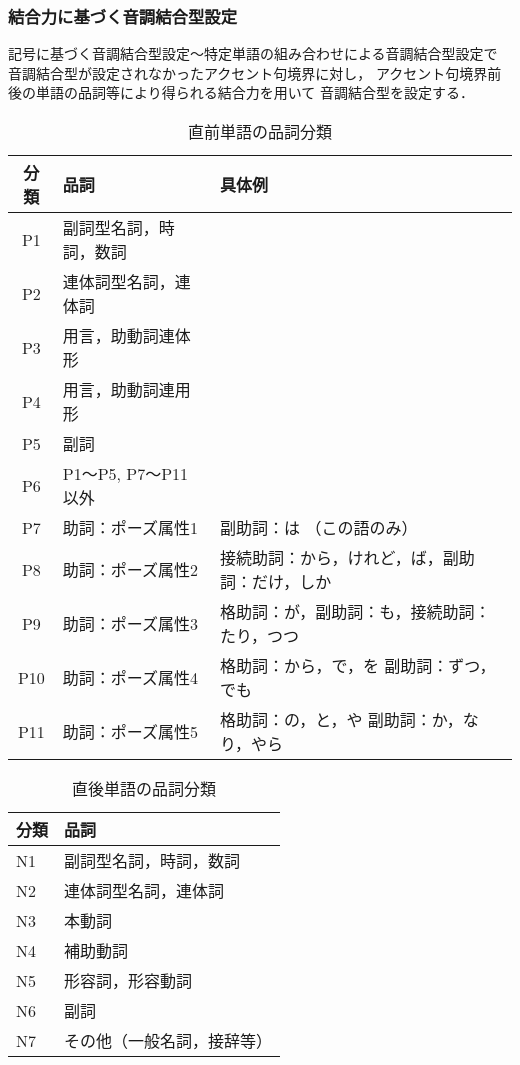 \subsubsection{結合力に基づく音調結合型設定}\label{subsub:ketsugo}
記号に基づく音調結合型設定〜特定単語の組み合わせによる音調結合型設定で
音調結合型が設定されなかったアクセント句境界に対し，
アクセント句境界前後の単語の品詞等により得られる結合力を用いて
音調結合型を設定する．

\begin{table}[t]
\caption{直前単語の品詞分類}
\label{tab:prev}
\begin{center}
\begin{tabular}{|c|l|l|} \hline
分類   & 品詞               & 具体例 \\\hline
P1 & 副詞型名詞，時詞，数詞 & \\ 
P2 & 連体詞型名詞，連体詞   & \\
P3 & 用言，助動詞連体形     & \\
P4 & 用言，助動詞連用形     & \\
P5 & 副詞                   & \\
P6 & P1〜P5, P7〜P11以外    & \\ 
P7 & 助詞：ポーズ属性1 & 副助詞：は （この語のみ）\\
P8 & 助詞：ポーズ属性2 & 接続助詞：から，けれど，ば，副助詞：だけ，しか\\
P9 & 助詞：ポーズ属性3 & 格助詞：が，副助詞：も，接続助詞：たり，つつ\\
P10 & 助詞：ポーズ属性4 & 格助詞：から，で，を 副助詞：ずつ，でも\\
P11 & 助詞：ポーズ属性5 & 格助詞：の，と，や 副助詞：か，なり，やら \\ \hline
\end{tabular}
\end{center}
\end{table}
\begin{table}[t]
\caption{直後単語の品詞分類}
\label{tab:next}
\begin{center}
\begin{tabular}{|l|l|} \hline
分類 & 品詞 \\\hline
N1 & 副詞型名詞，時詞，数詞 \\
N2 & 連体詞型名詞，連体詞 \\
N3 & 本動詞 \\
N4 & 補助動詞 \\
N5 & 形容詞，形容動詞 \\
N6 & 副詞 \\ 
N7 & その他（一般名詞，接辞等） \\\hline
\end{tabular}
\end{center}
\end{table}

